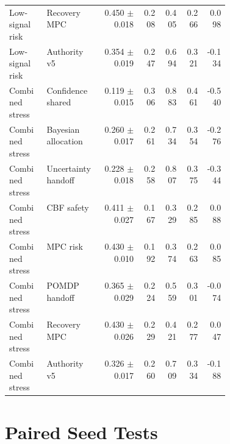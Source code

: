 \documentclass{article}
\begin{document}
\begin{center}
\begin{longtable}{p{0.17\linewidth}p{0.25\linewidth}rrrrr}
Low-signal risk & Recovery MPC & 0.450 $\pm$ 0.018 & 0.208 & 0.405 & 0.266 & 0.098\\
Low-signal risk & Authority v5 & 0.354 $\pm$ 0.019 & 0.247 & 0.694 & 0.321 & -0.134\\
Combined stress & Confidence shared & 0.119 $\pm$ 0.015 & 0.306 & 0.883 & 0.461 & -0.540\\
Combined stress & Bayesian allocation & 0.260 $\pm$ 0.017 & 0.261 & 0.734 & 0.354 & -0.276\\
Combined stress & Uncertainty handoff & 0.228 $\pm$ 0.018 & 0.258 & 0.807 & 0.375 & -0.344\\
Combined stress & CBF safety & 0.411 $\pm$ 0.027 & 0.167 & 0.329 & 0.285 & 0.088\\
Combined stress & MPC risk & 0.430 $\pm$ 0.010 & 0.192 & 0.374 & 0.263 & 0.085\\
Combined stress & POMDP handoff & 0.365 $\pm$ 0.029 & 0.224 & 0.559 & 0.301 & -0.074\\
Combined stress & Recovery MPC & 0.430 $\pm$ 0.026 & 0.229 & 0.421 & 0.277 & 0.047\\
Combined stress & Authority v5 & 0.326 $\pm$ 0.017 & 0.260 & 0.709 & 0.334 & -0.188\\
\bottomrule
\end{longtable}
\normalsize
\end{center}

\section{Paired Seed Tests}
\end{document}

